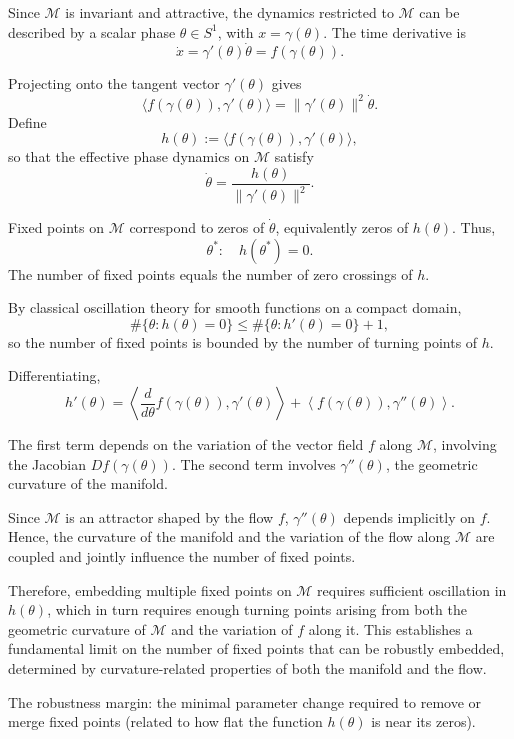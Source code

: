 \documentclass{article}
\begin{document}
Since \(\mathcal{M}\) is invariant and attractive, the dynamics restricted to \(\mathcal{M}\) can be described by a scalar phase \(\theta \in S^1\), with \(x = \gamma(\theta)\). The time derivative is
\[
\dot{x} = \gamma'(\theta) \dot{\theta} = f(\gamma(\theta)).
\]

Projecting onto the tangent vector \(\gamma'(\theta)\) gives
\[
\langle f(\gamma(\theta)), \gamma'(\theta) \rangle = \|\gamma'(\theta)\|^2 \dot{\theta}.
\]
Define
\[
h(\theta) := \langle f(\gamma(\theta)), \gamma'(\theta) \rangle,
\]
so that the effective phase dynamics on \(\mathcal{M}\) satisfy
\[
\dot{\theta} = \frac{h(\theta)}{\|\gamma'(\theta)\|^2}.
\]

Fixed points on \(\mathcal{M}\) correspond to zeros of \(\dot{\theta}\), equivalently zeros of \(h(\theta)\). Thus,
\[
\theta^* : \quad h(\theta^*) = 0.
\]
The number of fixed points equals the number of zero crossings of \(h\).

By classical oscillation theory for smooth functions on a compact domain,
\[
\#\{ \theta : h(\theta) = 0 \} \leq \#\{ \theta : h'(\theta) = 0 \} + 1,
\]
so the number of fixed points is bounded by the number of turning points of \(h\).

Differentiating,
\[
h'(\theta) = \left\langle \frac{d}{d\theta} f(\gamma(\theta)), \gamma'(\theta) \right\rangle + \left\langle f(\gamma(\theta)), \gamma''(\theta) \right\rangle.
\]

The first term depends on the variation of the vector field \(f\) along \(\mathcal{M}\), involving the Jacobian \(Df(\gamma(\theta))\). The second term involves \(\gamma''(\theta)\), the geometric curvature of the manifold.

Since \(\mathcal{M}\) is an attractor shaped by the flow \(f\), \(\gamma''(\theta)\) depends implicitly on \(f\). Hence, the curvature of the manifold and the variation of the flow along \(\mathcal{M}\) are coupled and jointly influence the number of fixed points.

Therefore, embedding multiple fixed points on \(\mathcal{M}\) requires sufficient oscillation in \(h(\theta)\), which in turn requires enough turning points arising from both the geometric curvature of \(\mathcal{M}\) and the variation of \(f\) along it. This establishes a fundamental limit on the number of fixed points that can be robustly embedded, determined by curvature-related properties of both the manifold and the flow.


The robustness margin: the minimal parameter change required to remove or merge fixed points (related to how flat the function \(h(\theta)\) is near its zeros).
\end{document}
